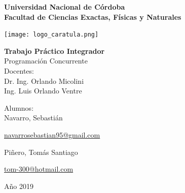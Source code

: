 \documentclass[12pt,a4paper]{article}
\begin{document}
\begin{titlepage}
    \begin{center}
        \vspace*{1cm}
        
        \Large
        \textbf{Universidad Nacional de Córdoba\\
        		Facultad de Ciencias Exactas, Físicas y Naturales}
        
        \vspace{0.5cm}
        \texttt{[image: logo\_caratula.png]}
        
        \vspace{1cm}
        
        \textbf{Trabajo Práctico Integrador}\\
        Programación Concurrente\\
        Docentes: \\
        Dr. Ing. Orlando Micolini\\
        Ing. Luis Orlando Ventre
        
        \vfill  
        
        \vspace{0.5cm}
        

        Alumnos:\\
        \Large
        Navarro, Sebastián\\
        
        \begin{large}
        \href{mailto:navarrosebastian95@gmail.com}{navarrosebastian95@gmail.com}\\
		\end{large} 
		
        Piñero, Tomás Santiago\\
        
        \begin{large}
        \href{mailto:tom-300@hotmail.com}{tom-300@hotmail.com}\\
		\end{large} 
		
        Año 2019\\
        
        
    \end{center}
\end{titlepage}

\setcounter{secnumdepth}{3}
\setcounter{tocdepth}{5}
\tableofcontents
\end{document}
